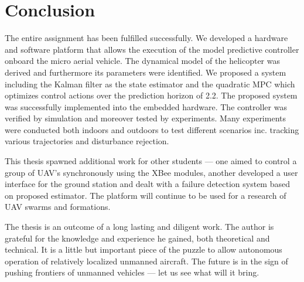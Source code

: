 \section{Conclusion}

The entire assignment has been fulfilled successfully. We developed a hardware and software platform that allows the execution of the model predictive controller onboard the micro aerial vehicle. The dynamical model of the helicopter was derived and furthermore its parameters were identified. We proposed a system including the Kalman filter as the state estimator and the quadratic MPC which optimizes control actions over the prediction horizon of 2.2. The proposed system was successfully implemented into the embedded hardware. The controller was verified by simulation and moreover tested by experiments. Many experiments were conducted both indoors and outdoors to test different scenarios inc. tracking various trajectories and disturbance rejection.

This thesis spawned additional work for other students \citep{klucka2015, fiedler2015} --- one aimed to control a group of UAV's synchronously using the XBee modules, another developed a user interface for the ground station and dealt with a failure detection system based on proposed estimator. The platform will continue to be used for  a research of UAV swarms and formations. 

The thesis is an outcome of a long lasting and diligent work. The author is grateful for the knowledge and experience he gained, both theoretical and technical. It is a little but important piece of the puzzle to allow autonomous operation of relatively localized unmanned aircraft. The future is in the sign of pushing frontiers of unmanned vehicles --- let us see what will it bring.